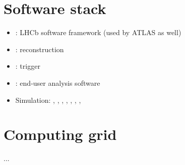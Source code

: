 \section{Software stack}
\begin{itemize}
  \item \Gaudi: LHCb software framework (used by ATLAS as well)
  \item \Brunel: reconstruction
  \item \Moore: trigger
  \item \DaVinci: end-user analysis software
  \item Simulation: \Gauss, \Boole, \Pythia, \EvtGen, \Photos, \Herwigpp, \Sherpa, \GeantFour
\end{itemize}
\section{Computing grid}
...
